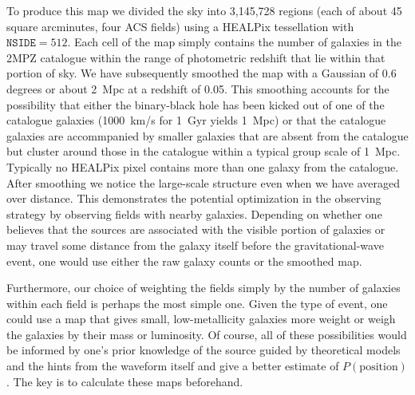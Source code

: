 \documentclass[useAMS,usenatbib]{mn2e}
\begin{document}
To produce this map we divided the sky into 3,145,728 regions (each of
about 45 square arcminutes, four ACS fields) using a HEALPix
\citep{2005ApJ...622..759G} tessellation with $\mathtt{NSIDE}=512$.
Each cell of the map simply contains the number of galaxies in the
2MPZ catalogue within the range of photometric redshift that lie
within that portion of sky.  We have subsequently smoothed the map
with a Gaussian of 0.6 degrees or about 2~Mpc at a redshift of 0.05.
This smoothing accounts for the possibility that either the
binary-black hole has been kicked out of one of the catalogue galaxies
(1000~km/s for 1~Gyr yields 1~Mpc) or that the catalogue galaxies are
accommpanied by smaller galaxies that are absent from the catalogue
but cluster around those in the catalogue within a typical group scale
of 1~Mpc.  Typically no HEALPix pixel contains more than one galaxy
from the catalogue.  After smoothing we notice the large-scale
structure even when we have averaged over distance.  This demonstrates
the potential optimization in the observing strategy by observing
fields with nearby galaxies. Depending on whether one believes that
the sources are associated with the visible portion of galaxies or may
travel some distance from the galaxy itself before the
gravitational-wave event, one would use either the raw galaxy counts
or the smoothed map.

Furthermore, our choice of weighting the fields simply by the number
of galaxies within each field is perhaps the most simple one.  Given
the type of event, one could use a map that gives small,
low-metallicity galaxies more weight or weigh the galaxies by their
mass or luminosity.  Of course, all of these possibilities would be
informed by one's prior knowledge of the source guided by
theoretical models and the hints from the waveform itself and give a
better estimate of $P(\mathrm{position})$.  The key is to calculate these
maps beforehand.
\end{document}
